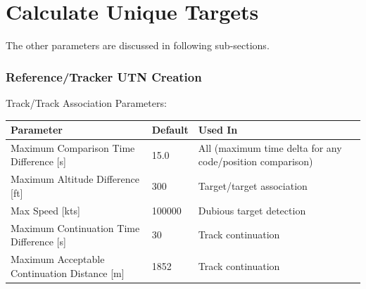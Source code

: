 \section{Calculate Unique Targets}


The other parameters are discussed in following sub-sections.

\subsubsection{Reference/Tracker UTN Creation}

Track/Track Association Parameters:
\begin{table}[H]
  \center
  \begin{tabularx}{\textwidth}{ | X | l | X |}
    \hline
    \textbf{Parameter} & \textbf{Default} &  \textbf{Used In} \\ \hline
    Maximum Comparison Time Difference [s] & 15.0 & All (maximum time delta for any code/position comparison) \\ \hline

    Maximum Altitude Difference [ft] & 300 & Target/target association \\ \hline

    Max Speed [kts] & 100000 & Dubious target detection \\ \hline
    Maximum Continuation Time Difference [s] & 30 & Track continuation \\ \hline
    Maximum Acceptable Continuation Distance [m] & 1852 & Track continuation \\ \hline
  \end{tabularx}
\end{table}
\ \\

